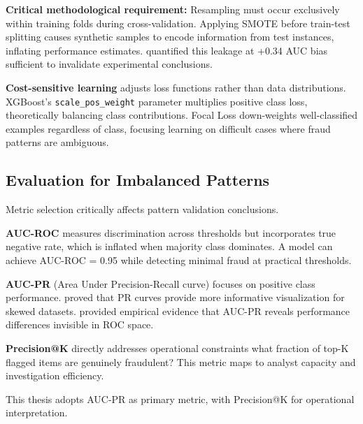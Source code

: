 \textbf{Critical methodological requirement:} Resampling must occur exclusively within training folds during cross-validation. Applying SMOTE before train-test splitting causes synthetic samples to encode information from test instances, inflating performance estimates. \citeauthor{demircioglu2024measuring} \cite{demircioglu2024measuring} quantified this leakage at +0.34 AUC bias sufficient to invalidate experimental conclusions.

\textbf{Cost-sensitive learning} adjusts loss functions rather than data distributions. XGBoost's \texttt{scale\_pos\_weight} parameter multiplies positive class loss, theoretically balancing class contributions. Focal Loss \cite{lin2017focal} down-weights well-classified examples regardless of class, focusing learning on difficult cases where fraud patterns are ambiguous.

\subsection{Evaluation for Imbalanced Patterns}

Metric selection critically affects pattern validation conclusions.

\textbf{AUC-ROC} measures discrimination across thresholds but incorporates true negative rate, which is inflated when majority class dominates. A model can achieve AUC-ROC = 0.95 while detecting minimal fraud at practical thresholds.

\textbf{AUC-PR} (Area Under Precision-Recall curve) focuses on positive class performance. \citeauthor{davis2006relationship} \cite{davis2006relationship} proved that PR curves provide more informative visualization for skewed datasets. \citeauthor{saito2015precision} \cite{saito2015precision} provided empirical evidence that AUC-PR reveals performance differences invisible in ROC space.

\textbf{Precision@K} directly addresses operational constraints what fraction of top-K flagged items are genuinely fraudulent? This metric maps to analyst capacity and investigation efficiency.

This thesis adopts AUC-PR as primary metric, with Precision@K for operational interpretation.
